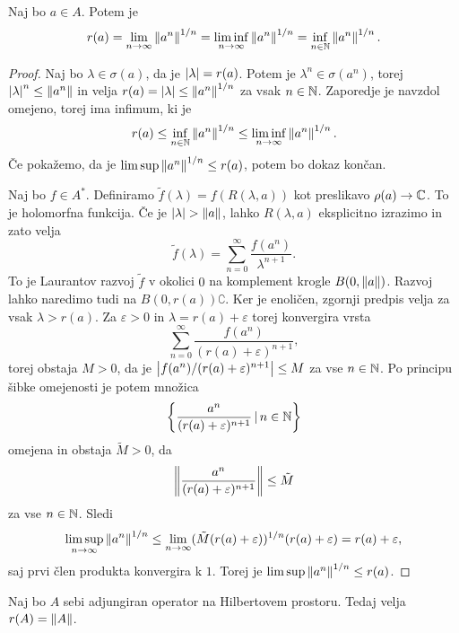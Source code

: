 \begin{izrek}
  Naj bo $a \in A$.
  Potem je
  \[
	r(a) = \lim_{n \to \infty} \left\lVert a^n\right\rVert^{1/n} = \liminf_{n \to \infty}
	\left\lVert a^n\right\rVert^{1/n}
	= \inf_{n \in \mathbb{N}} \left\lVert a^n\right\rVert^{1/n}.
  \]
\end{izrek}

\begin{proof}
  Naj bo $\lambda \in \sigma(a)$, da je $\left| \lambda \right| = r(a)$.
  Potem je $\lambda^n \in \sigma(a^n)$, torej $\left| \lambda \right|^n \le \left\lVert a^n\right\rVert$
  in velja $r(a) = \left| \lambda \right| \le \left\lVert a^n\right\rVert^{1/n}$ za vsak $n \in \mathbb{N}$.
  Zaporedje je navzdol omejeno, torej ima infimum, ki je
  \[
	r(a) \le \inf_{n \in \mathbb{N}} \left\lVert a^n\right\rVert^{1/n} \le \liminf_{n \to \infty}
	\left\lVert a^n\right\rVert^{1/n}.
  \]
  Če pokažemo, da je $\limsup \left\lVert a^n\right\rVert^{1/n} \le r(a)$, potem bo dokaz končan.

  Naj bo $f \in A^*$.
  Definiramo $\tilde{f}(\lambda) = f(R(\lambda, a))$ kot preslikavo $\rho(a)
  \to \mathbb{C}$.
  To je holomorfna funkcija.
  Če je $\left| \lambda \right| > \left\lVert a\right\rVert$, lahko $R(\lambda, a)$ eksplicitno izrazimo
  in zato velja
  \[
	\tilde{f}(\lambda) = \sum_{n=0}^\infty \frac{f(a^n)}{\lambda^{n+1}}.
  \]
  To je Laurantov razvoj $\tilde{f}$ v okolici $0$ na komplement krogle $B(0,
  \left\lVert a\right\rVert)$.
  Razvoj lahko naredimo tudi na $B(0, r(a))\complement$.
  Ker je enoličen, zgornji predpis velja za vsak $\lambda > r(a)$.
  Za $\varepsilon > 0$ in $\lambda = r(a) + \varepsilon$ torej konvergira vrsta
  \[
	\sum_{n=0}^\infty \frac{f(a^n)}{(r(a) + \varepsilon)^{n+1}},
  \]
  torej obstaja $M > 0$, da je $\left| f(a^n) / (r(a) + \varepsilon)^{n+1} \right| \le M$
  za vse $n \in \mathbb{N}$.
  Po principu šibke omejenosti je potem množica
  \[
	\left\{ \frac{a^n}{(r(a) + \varepsilon)^{n+1}} \,|\, n \in \mathbb{N}\right\}
  \]
  omejena in obstaja $\tilde{M} > 0$, da
  \[
	\left\lVert\frac{a^n}{(r(a) + \varepsilon)^{n+1}}\right\rVert \le \tilde{M}
  \]
  za vse $n \in \mathbb{N}$.
  Sledi
  \[
	\limsup_{n \to \infty} \left\lVert a^n\right\rVert^{1/n} \le \lim_{n \to \infty} (\tilde{M}
	(r(a) + \varepsilon))^{1/n} (r(a) + \varepsilon)
	= r(a) + \varepsilon,
  \]
  saj prvi člen produkta konvergira k $1$.
  Torej je $\limsup \left\lVert a^n\right\rVert^{1/n} \le r(a)$.
\end{proof}


\begin{posledica}
  Naj bo $A$ sebi adjungiran operator na Hilbertovem prostoru.
  Tedaj velja $r(A) = \left\lVert A\right\rVert$.
\end{posledica}

